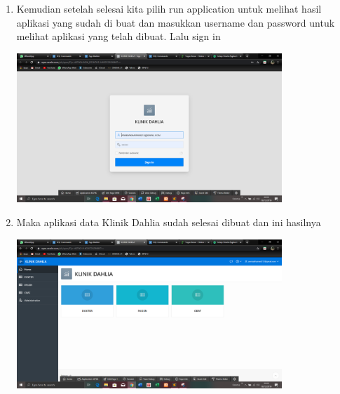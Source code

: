 \documentclass{article}
\begin{document}
\begin{enumerate}
\item Kemudian setelah selesai kita pilih run application untuk melihat hasil aplikasi yang sudah di buat dan masukkan username dan password untuk melihat aplikasi yang telah dibuat. Lalu sign in
\begin{center}
    \includegraphics[width=10cm]{figure/211.png}
\end{center}
\item Maka aplikasi data Klinik Dahlia sudah selesai dibuat dan ini hasilnya
\begin{center}
\includegraphics[width=10cm]{figure/212.png}
\end{center}
\end{enumerate}
\end{document}

